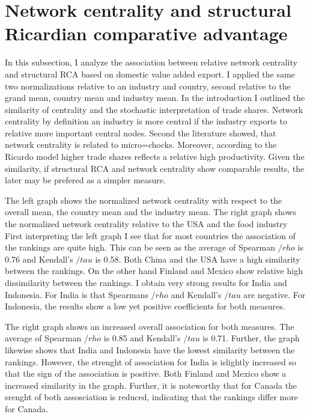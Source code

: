 \section{Network centrality and structural Ricardian comparative advantage}
In this subsection, I analyze the association between relative network centrality and  structural RCA based on domestic value added export.
I applied the same two normalizations relative to an industry and country, second relative to the grand mean, country mean and industry mean.
In the introduction I  outlined the similarity of centrality and the stochastic  interpretation of trade shares.
 Network centrality by definition an industry is more central if the industry exports to relative more important central nodes.
 Second the literature showed, that network centrality is related to micro=chocks.
Moreover, according to the Ricardo model higher trade shares reflects a relative high productivity.
Given the similarity, if structural RCA and network centrality show comparable results, the later may be prefered as a simpler measure.    \par
The left graph shows the normalized network centrality with respect to the overall mean, the country mean and the industry mean.
The right graph shows the normalized network centrality relative to the USA and the food industry
First interpreting the left graph I see that for most countries the association of the rankings are quite high.
This can be seen as the average of Spearman $/rho$ is  0.76 and Kendall's  $/tau$ is 0.58.
Both China and the USA have a high similarity between the rankings.
On the other hand Finland and Mexico show relative high dissimilarity between the rankings.
I obtain very strong results for India and Indonesia.
For India is that Spearmans $/rho$ and  Kendall's  $/tau$ are negative.
For Indonesia, the results show a low yet positive coefficients for both measures.
\par
The right graph shows an increased overall association for both measures.
The average of Spearman $/rho$ is  0.85 and Kendall's  $/tau$ is 0.71.
Further, the graph likewise shows that India and Indonesia have the lowest similarity between the rankings.
However, the strenght of association for India is islightly increased so that the sign of the association is positive. 
Both Finland and Mexico show a increased similarity in the graph.
Further, it is noteworthy that for Canada the srenght of both assosciation is reduced, indicating that the
rankings differ more for Canada.

